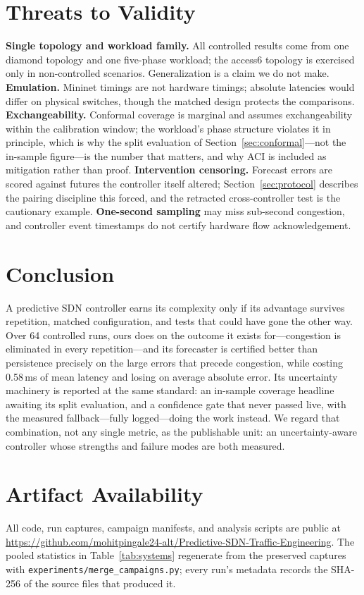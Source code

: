 \documentclass[conference]{IEEEtran}
\begin{document}
\section{Threats to Validity}
\label{sec:threats}
\textbf{Single topology and workload family.} All controlled results
come from one diamond topology and one five-phase workload; the
access6 topology is exercised only in non-controlled scenarios.
Generalization is a claim we do not make.
\textbf{Emulation.} Mininet timings are not hardware timings;
absolute latencies would differ on physical switches, though the
matched design protects the comparisons.
\textbf{Exchangeability.} Conformal coverage is marginal and assumes
exchangeability within the calibration window; the workload's phase
structure violates it in principle, which is why the split evaluation
of Section~\ref{sec:conformal}---not the in-sample figure---is the
number that matters, and why ACI is included as mitigation rather
than proof.
\textbf{Intervention censoring.} Forecast errors are scored against
futures the controller itself altered; Section~\ref{sec:protocol}
describes the pairing discipline this forced, and the retracted
cross-controller test is the cautionary example.
\textbf{One-second sampling} may miss sub-second congestion, and
controller event timestamps do not certify hardware flow
acknowledgement.

\section{Conclusion}
A predictive SDN controller earns its complexity only if its
advantage survives repetition, matched configuration, and tests that
could have gone the other way. Over 64 controlled runs, ours does on
the outcome it exists for---congestion is eliminated in every
repetition---and its forecaster is certified better than persistence
precisely on the large errors that precede congestion, while costing
0.58\,ms of mean latency and losing on average absolute error. Its
uncertainty machinery is reported at the same standard: an in-sample
coverage headline awaiting its split evaluation, and a confidence
gate that never passed live, with the measured fallback---fully
logged---doing the work instead. We regard that combination, not any
single metric, as the publishable unit: an uncertainty-aware
controller whose strengths and failure modes are both measured.

\section*{Artifact Availability}
All code, run captures, campaign manifests, and analysis scripts are
public at
\url{https://github.com/mohitpingale24-alt/Predictive-SDN-Traffic-Engineering}.
The pooled statistics in Table~\ref{tab:systems} regenerate from the
preserved captures with \texttt{experiments/merge\_campaigns.py};
every run's metadata records the SHA-256 of the source files that
produced it.
\end{document}
